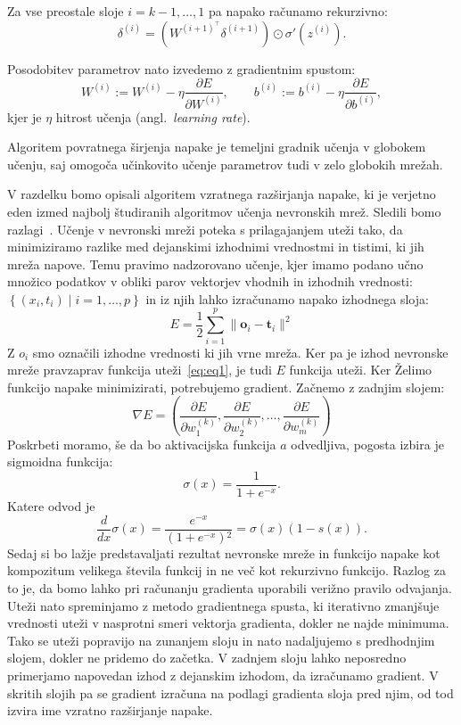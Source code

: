 Za vse preostale sloje $i = k-1, \dots, 1$ pa napako računamo rekurzivno:
\[
\delta^{(i)} = \left( W^{(i+1)^\top} \delta^{(i+1)} \right) \odot \sigma'\left(z^{(i)}\right).
\]

Posodobitev parametrov nato izvedemo z gradientnim spustom:
\[
W^{(i)} := W^{(i)} - \eta \frac{\partial E}{\partial W^{(i)}}, \qquad
b^{(i)} := b^{(i)} - \eta \frac{\partial E}{\partial b^{(i)}},
\]
kjer je $\eta$ hitrost učenja (angl.\ \textit{learning rate}).

Algoritem povratnega širjenja napake je temeljni gradnik učenja v globokem učenju, saj omogoča učinkovito učenje parametrov tudi v zelo globokih mrežah.



V razdelku bomo opisali algoritem vzratnega razširjanja napake, ki je verjetno eden izmed najbolj študiranih algoritmov učenja nevronskih mrež. Sledili bomo razlagi~\cite{rojas1996backpropagation}.
Učenje v nevronski mreži poteka s prilagajanjem uteži tako, da minimiziramo razlike med dejanskimi izhodnimi vrednostmi in tistimi, ki jih mreža napove. Temu pravimo nadzorovano učenje, kjer imamo podano učno množico podatkov v obliki parov vektorjev vhodnih in izhodnih vrednosti: $\left\{ (x_i, t_i) \mid i = 1, \ldots, p \right\}$ in iz njih lahko izračunamo napako izhodnega sloja:
\begin{equation}
  E = \frac{1}{2} \sum_{i=1}^{p} \|\mathbf{o}_i - \mathbf{t}_i\|^2
\end{equation}
Z $o_{i}$ smo označili izhodne vrednosti ki jih vrne mreža. Ker pa je izhod nevronske mreže pravzaprav funkcija uteži~\ref{eq:eq1}, je tudi $E$ funkcija uteži. Ker Želimo funkcijo napake minimizirati, potrebujemo gradient. Začnemo z zadnjim slojem:
\begin{equation}
  \nabla E = \left( \frac{\partial E}{\partial w^{(k)}_1}, \frac{\partial E}{\partial w^{(k)}_2}, \ldots, \frac{\partial E}{\partial w^{(k)}_m} \right)
\end{equation}
Poskrbeti moramo, še da bo aktivacijska funkcija $a$ odvedljiva, pogosta izbira je sigmoidna funkcija:
\begin{equation}
  \sigma(x) = \frac{1}{1 + e^{-x}}.
\end{equation}
Katere odvod je
\begin{equation}
  \frac{d}{dx}\sigma(x) = \frac{e^{-x}}{\left(1+e^{-x}\right){}^2} = \sigma(x)\left(1 - s(x)\right).
\end{equation}
Sedaj si bo lažje predstavaljati rezultat nevronske mreže in funkcijo napake kot kompozitum velikega števila funkcij in ne več kot rekurzivno funkcijo. Razlog za to je, da bomo lahko pri računanju gradienta uporabili verižno pravilo odvajanja. Uteži nato spreminjamo z metodo gradientnega spusta, ki iterativno zmanjšuje vrednosti uteži v nasprotni smeri vektorja gradienta, dokler ne najde minimuma. Tako se uteži popravijo na zunanjem sloju in nato nadaljujemo s predhodnjim slojem, dokler ne pridemo do začetka. V zadnjem sloju lahko neposredno primerjamo napovedan izhod z dejanskim izhodom, da izračunamo gradient. V skritih slojih pa se gradient izračuna na podlagi gradienta sloja pred njim, od tod izvira ime vzratno razširjanje napake.

